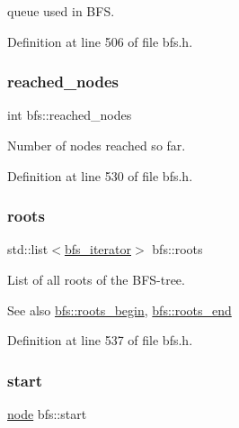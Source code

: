 queue used in B\+FS. 



Definition at line 506 of file bfs.\+h.

\mbox{\label{classbfs_ac3db80b59d5db049199936445a6c2da8}} 
\subsubsection{\texorpdfstring{reached\+\_\+nodes}{reached\_nodes}}
{\footnotesize\ttfamily int bfs\+::reached\+\_\+nodes\hspace{0.3cm}{\ttfamily [protected]}}



Number of nodes reached so far. 



Definition at line 530 of file bfs.\+h.

\mbox{\label{classbfs_acea071a6fdad8e590b40830ced241824}} 
\subsubsection{\texorpdfstring{roots}{roots}}
{\footnotesize\ttfamily std\+::list$<$\mbox{\hyperlink{classbfs_a1035f068a96de0370789ec315aef4f73}{bfs\+\_\+iterator}}$>$ bfs\+::roots\hspace{0.3cm}{\ttfamily [protected]}}



List of all roots of the B\+F\+S-\/tree. 

\begin{DoxySeeAlso}{See also}
\mbox{\hyperlink{classbfs_a45d58d06d0dcd6427edad2ec52a6ebb9}{bfs\+::roots\+\_\+begin}}, \mbox{\hyperlink{classbfs_ac84b90f777adeb90390689db62602d73}{bfs\+::roots\+\_\+end}} 
\end{DoxySeeAlso}


Definition at line 537 of file bfs.\+h.

\mbox{\label{classbfs_af2ab561d9e60a9fc2e25b02d1f807f96}} 
\subsubsection{\texorpdfstring{start}{start}}
{\footnotesize\ttfamily \mbox{\hyperlink{classnode}{node}} bfs\+::start\hspace{0.3cm}{\ttfamily [protected]}}



